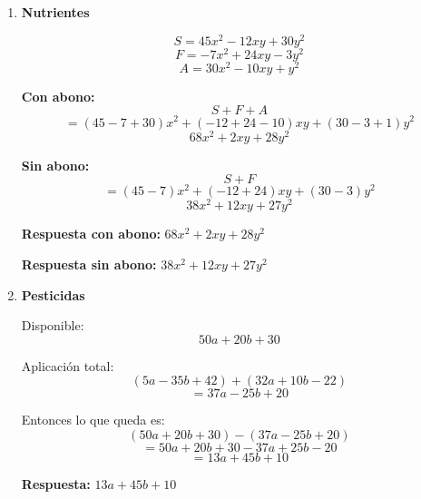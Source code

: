 \documentclass[12pt]{article}
\begin{document}
\begin{enumerate}[itemsep=0.7cm]
		Base:
		\[
		2n + 15
		\]
		
		Refuerzo:
		\[
		3n - 10
		\]
		
		Cantidad total:
		\[
		(2n+15)+(3n-10)=5n+5
		\]
		
		\textbf{Respuesta:} \(\boxed{5n+5}\)
		
		\item \textbf{Nutrientes}
		
		\[
		S = 45x^2 - 12xy + 30y^2
		\]
		\[
		F = -7x^2 + 24xy - 3y^2
		\]
		\[
		A = 30x^2 - 10xy + y^2
		\]
		
		\textbf{Con abono:}
		\[
		S+F+A
		\]
		\[
		=(45-7+30)x^2 + (-12+24-10)xy + (30-3+1)y^2
		\]
		\[
		68x^2 + 2xy + 28y^2
		\]
		
		\textbf{Sin abono:}
		\[
		S+F
		\]
		\[
		=(45-7)x^2 + (-12+24)xy + (30-3)y^2
		\]
		\[
		38x^2 + 12xy + 27y^2
		\]
		
		\textbf{Respuesta con abono:} \(\boxed{68x^2 + 2xy + 28y^2}\)
		
		\textbf{Respuesta sin abono:} \(\boxed{38x^2 + 12xy + 27y^2}\)
		
			\newpage
		
		\vspace*{1em}		
				
		\item \textbf{Pesticidas}
		
		Disponible:
		\[
		50a + 20b + 30
		\]
		
		Aplicación total:
		\[
		(5a - 35b + 42) + (32a + 10b - 22)
		\]
		\[
		= 37a - 25b + 20
		\]
		
		Entonces lo que queda es:
		\[
		(50a + 20b + 30) - (37a - 25b + 20)
		\]
		\[
		= 50a + 20b + 30 - 37a + 25b - 20
		\]
		\[
		= 13a + 45b + 10
		\]
		
		\textbf{Respuesta:} \(\boxed{13a + 45b + 10}\)
		
	\end{enumerate}
	
\end{document}
